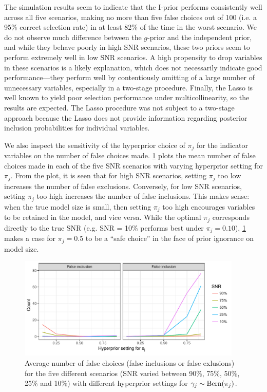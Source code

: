 \documentclass[11pt,twoside,openright]{report}
\begin{document}
The simulation results seem to indicate that the I-prior performs consistently well across all five scenarios, making no more than five false choices out of 100 (i.e. a 95\% correct selection rate) in at least 82\% of the time in the worst scenario.
We do not observe much difference between the $g$-prior and the independent prior, and while they behave poorly in high SNR scenarios, these two priors seem to perform extremely well in low SNR scenarios.
A high propensity to drop variables in these scenarios is a likely explanation, which does not necessarily indicate good performance---they perform well by contentiously omitting of a large number of unnecessary variables, especially in a two-stage procedure.
Finally, the Lasso is well known to yield poor selection performance under multicollinearity, so the results are expected.
The Lasso procedure was not subject to a two-stage approach because the Lasso does not provide information regarding posterior inclusion probabilities for individual variables.

We also inspect the sensitivity of the hyperprior choice of $\pi_j$ for the indicator variables on the number of false choices made.
\cref{fig:simres2} plots the mean number of false choices made in each of the five SNR scenarios with varying hyperprior setting for $\pi_j$.
From the plot, it is seen that for high SNR scenarios, setting $\pi_j$ too low increases the number of false exclusions.
Conversely, for low SNR scenarios, setting $\pi_j$ too high increases the number of false inclusions.
This makes sense: when the true model size is small, then setting $\pi_j$ too high encourages variables to be retained in the model, and vice versa.
While the optimal $\pi_j$ corresponds directly to the true SNR (e.g. SNR = 10\% performs best under $\pi_j=0.10$), \cref{fig:simres2} makes a case for $\pi_j=0.5$ to be a ``safe choice'' in the face of prior ignorance on model size.

\begin{figure}[hbt]
  \centering
  \includegraphics[width=0.95\textwidth]{figure/06-sens_analysis}
  \caption[Sensitivity analysis of hyperprior choice on number of false choices]{Average number of false choices (false inclusions or false exlusions) for the five different scenarios (SNR varied between 90\%, 75\%, 50\%, 25\% and 10\%) with different hyperprior settings for $\gamma_j\sim\operatorname{Bern}(\pi_j)$.}
  \label{fig:simres2}
\end{figure}
\vspace{-1em}
\end{document}
